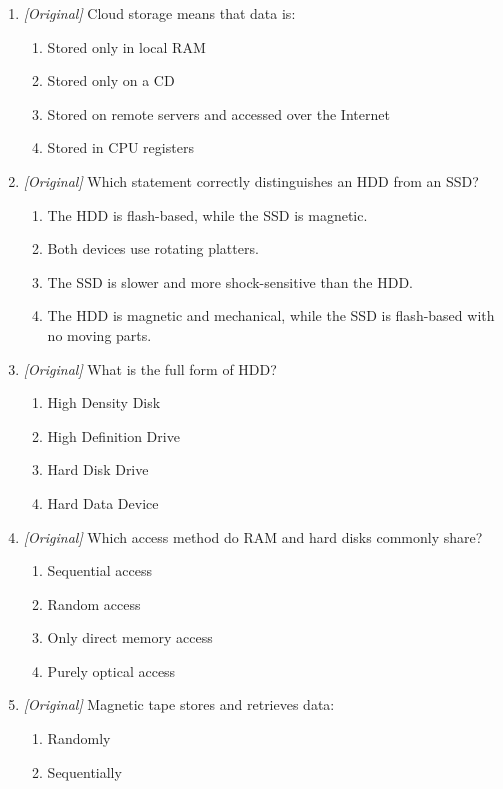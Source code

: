 \documentclass[11pt]{article}
\begin{document}
\begin{enumerate}[label=\textbf{Q\arabic*.}, leftmargin=*]
\item \textit{[Original]} Cloud storage means that data is:
  \begin{enumerate}[label=\Alph*.]
    \item Stored only in local RAM
    \item Stored only on a CD
    \item Stored on remote servers and accessed over the Internet
    \item Stored in CPU registers
  \end{enumerate}
\item \textit{[Original]} Which statement correctly distinguishes an HDD
  from an SSD?
  \begin{enumerate}[label=\Alph*.]
    \item The HDD is flash-based, while the SSD is magnetic.
    \item Both devices use rotating platters.
    \item The SSD is slower and more shock-sensitive than the HDD.
    \item The HDD is magnetic and mechanical, while the SSD is flash-based
      with no moving parts.
  \end{enumerate}
\item \textit{[Original]} What is the full form of HDD?
  \begin{enumerate}[label=\Alph*.]
    \item High Density Disk
    \item High Definition Drive
    \item Hard Disk Drive
    \item Hard Data Device
  \end{enumerate}
\item \textit{[Original]} Which access method do RAM and hard disks commonly
  share?
  \begin{enumerate}[label=\Alph*.]
    \item Sequential access
    \item Random access
    \item Only direct memory access
    \item Purely optical access
  \end{enumerate}
\item \textit{[Original]} Magnetic tape stores and retrieves data:
  \begin{enumerate}[label=\Alph*.]
    \item Randomly
    \item Sequentially

\end{enumerate}
\end{enumerate}
\end{document}

